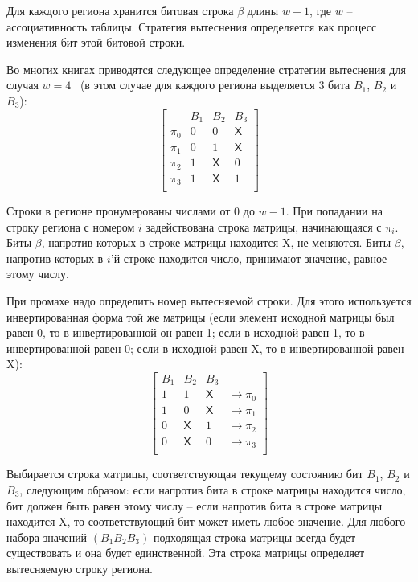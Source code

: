 Для каждого региона хранится битовая строка $\beta$ длины $w{-}1$, где $w$ --
ассоциативность таблицы. Стратегия вытеснения определяется как процесс изменения
бит этой битовой строки.

Во многих книгах приводятся следующее определение стратегии
вытеснения \PseudoLRU для случая
$w=4$~\cite{FundamentalOfComputerOrganizationAndDesign} (в этом
случае для каждого региона выделяется 3 бита $B_1$, $B_2$ и $B_3$):
$$ \left[
  \begin{array}{c|ccc}
          & B_1 & B_2 & B_3 \\ \hline
    \pi_0 & 0 & 0 & \textsf{X} \\
    \pi_1 & 0 & 1 & \textsf{X} \\
    \pi_2 & 1 & \textsf{X} & 0 \\
    \pi_3 & 1 & \textsf{X} & 1 \\
  \end{array}
\right]
$$

Строки в регионе пронумерованы числами от 0 до $w{-}1$. При попадании на строку
региона с номером $i$ задействована строка матрицы, начинающаяся с $\pi_i$. Биты
$\beta$, напротив которых в строке матрицы находится \textsf{X}, не меняются.
Биты $\beta$, напротив которых в $i$'й строке находится число, принимают
значение, равное этому числу.

При промахе надо определить номер вытесняемой строки. Для этого используется
инвертированная форма той же матрицы (если элемент исходной матрицы был равен 0, то в инвертированной он равен 1; если в исходной равен 1, то в инвертированной равен 0; если в исходной равен \textsf{X}, то в инвертированной равен \textsf{X}):
$$
\left[
  \begin{array}{ccc|c}
    B_1 & B_2 & B_3 & \\ \hline
    1 & 1 & \textsf{X} & \rightarrow \pi_0 \\
    1 & 0 & \textsf{X} & \rightarrow \pi_1 \\
    0 & \textsf{X} & 1 & \rightarrow \pi_2 \\
    0 & \textsf{X} & 0 & \rightarrow \pi_3 \\
  \end{array}
\right]
$$

Выбирается строка матрицы, соответствующая текущему состоянию бит $B_1$,
$B_2$ и $B_3$, следующим образом: если напротив бита в строке матрицы находится число, бит
должен быть равен этому числу -- если напротив бита в строке матрицы
находится \textsf{X}, то соответствующий бит может иметь любое значение. Для любого набора значений $(B_1 B_2 B_3)$ подходящая строка матрицы всегда будет существовать и она будет единственной. Эта строка матрицы определяет вытесняемую строку региона.

